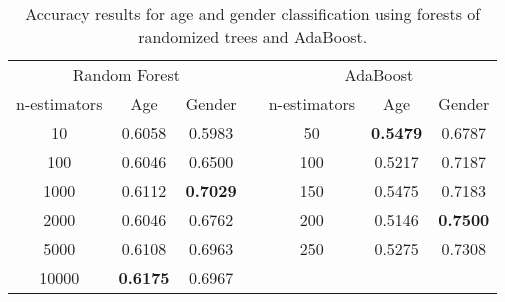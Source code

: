 \documentclass[a4paper]{llncs}
\begin{document}
\begin{table}[!htbp]
\centering
\begin{tabular}{|c|cc|l|c|cc|}
\cline{1-3} \cline{5-7}
\multicolumn{3}{|c|}{Random Forest}              &  & \multicolumn{3}{c|}{AdaBoost}                    \\ \cline{1-3} \cline{5-7} 
n-estimators & Age             & Gender          &  & n-estimators & Age             & Gender          \\ \cline{1-3} \cline{5-7} 
10           & 0.6058          & 0.5983          &  & 50           & \textbf{0.5479} & 0.6787          \\ %
100          & 0.6046          & 0.6500          &  & 100          & 0.5217          & 0.7187          \\ %
1000         & 0.6112          & \textbf{0.7029} &  & 150          & 0.5475          & 0.7183          \\ %
2000         & 0.6046          & 0.6762          &  & 200          & 0.5146          & \textbf{0.7500} \\ %
5000         & 0.6108          & 0.6963          &  & 250          & 0.5275          & 0.7308          \\ %
10000        & \textbf{0.6175} & 0.6967          &  &              &                 &                 \\ \cline{1-3} \cline{5-7} 
\end{tabular}
\caption{Accuracy results for age and gender classification using forests of randomized trees and AdaBoost.}
\label{table:RandomForestsAndAdaBoost}
\end{table}
\end{document}
